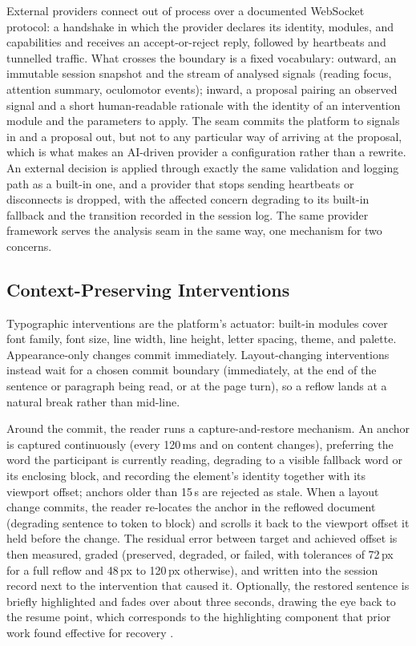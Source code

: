 External providers connect out of process over a documented WebSocket protocol: a handshake in which the provider declares its identity, modules, and capabilities and receives an accept-or-reject reply, followed by heartbeats and tunnelled traffic.
What crosses the boundary is a fixed vocabulary: outward, an immutable session snapshot and the stream of analysed signals (reading focus, attention summary, oculomotor events); inward, a proposal pairing an observed signal and a short human-readable rationale with the identity of an intervention module and the parameters to apply.
The seam commits the platform to signals in and a proposal out, but not to any particular way of arriving at the proposal, which is what makes an AI-driven provider a configuration rather than a rewrite.
An external decision is applied through exactly the same validation and logging path as a built-in one, and a provider that stops sending heartbeats or disconnects is dropped, with the affected concern degrading to its built-in fallback and the transition recorded in the session log.
The same provider framework serves the analysis seam in the same way, one mechanism for two concerns.

\subsection{Context-Preserving Interventions}
\label{sec:platform-context}

Typographic interventions are the platform's actuator: built-in modules cover font family, font size, line width, line height, letter spacing, theme, and palette.
Appearance-only changes commit immediately.
Layout-changing interventions instead wait for a chosen commit boundary (immediately, at the end of the sentence or paragraph being read, or at the page turn), so a reflow lands at a natural break rather than mid-line.

Around the commit, the reader runs a capture-and-restore mechanism.
An anchor is captured continuously (every 120\,ms and on content changes), preferring the word the participant is currently reading, degrading to a visible fallback word or its enclosing block, and recording the element's identity together with its viewport offset; anchors older than 15\,s are rejected as stale.
When a layout change commits, the reader re-locates the anchor in the reflowed document (degrading sentence to token to block) and scrolls it back to the viewport offset it held before the change.
The residual error between target and achieved offset is then measured, graded (preserved, degraded, or failed, with tolerances of 72\,px for a full reflow and 48\,px to 120\,px otherwise), and written into the session record next to the intervention that caused it.
Optionally, the restored sentence is briefly highlighted and fades over about three seconds, drawing the eye back to the resume point, which corresponds to the highlighting component that prior work found effective for recovery \cite{jensen2025context}.

